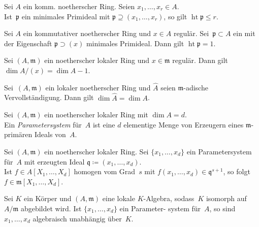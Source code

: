 \documentclass{cheat-sheet}
\DeclareMathOperator{\height}{ht} %
\newcommand{\ppp}{\mathfrak{p}}
\newcommand{\qqq}{\mathfrak{q}}
\newcommand{\mmm}{\mathfrak{m}}
\begin{document}
\begin{kor}
  Sei $A$ ein komm. noetherscher Ring.
  Seien $x_1, \ldots, x_r \in A$. \\
  Ist~$\ppp$ ein minimales Primideal mit $\ppp \supseteq (x_1, \ldots, x_r)$, so gilt $\height \ppp \leq r$.
\end{kor}

\begin{kor}
  Sei $A$ ein kommutativer noetherscher Ring und $x \in A$ regulär.
  Sei~$\ppp \subset A$ ein mit der Eigenschaft $\ppp \supset (x)$ minimales Primideal.
  Dann gilt $\height \ppp = 1$.
\end{kor}

\begin{kor}
  Sei $(A, \mmm)$ ein noetherscher lokaler Ring und $x \in \mmm$ regulär.
  Dann gilt $\dim A/(x) = \dim A - 1$.
\end{kor}

\begin{kor}
  Sei~$(A, \mmm)$ ein lokaler noetherscher Ring und $\hat{A}$ seien $\mmm$-adische Vervollständigung.
  Dann gilt $\dim \hat{A} = \dim A$.
\end{kor}


\begin{defn}
  Sei $(A, \mmm)$ ein noetherscher lokaler Ring mit $\dim A = d$. \\
  Ein \emph{Parametersystem} für~$A$ ist eine $d$ elementige Menge von Erzeugern eines $\mmm$-primären Ideals von~$A$.
\end{defn}

\begin{prop}
  Sei $(A, \mmm)$ ein noetherscher lokaler Ring.
  Sei $\{ x_1, \ldots, x_d \}$ ein Parametersystem für~$A$ mit erzeugten Ideal $\qqq \coloneqq (x_1, \ldots, x_d)$. \\
  Ist $f \in A [X_1, \ldots, X_d]$ homogen vom Grad~$s$ mit $f(x_1, \ldots, x_d) \in \qqq^{s+1}$, so folgt $f \in \mmm [X_1, \ldots, X_d]$.
\end{prop}

\begin{kor}
  Sei $K$ ein Körper und $(A, \mmm)$ eine lokale $K$-Algebra, sodass~$K$ isomorph auf $A/\mmm$ abgebildet wird.
  Ist $\{ x_1, \ldots, x_d \}$ ein Parameter- system für~$A$, so sind $x_1, \ldots, x_d$ algebraisch unabhängig über~$K$.
\end{kor}

\end{document}
